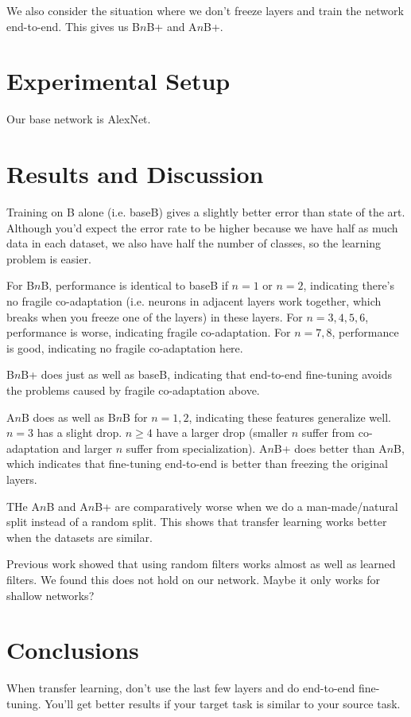 \documentclass[a4paper]{article}
\begin{document}
We also consider the situation where we don't freeze layers and train the
network end-to-end. This gives us B$n$B+ and A$n$B+.

\section{Experimental Setup}
Our base network is AlexNet.

\section{Results and Discussion}
Training on B alone (i.e. baseB) gives a slightly better error than state of the
art. Although you'd expect the error rate to be higher because we have half as
much data in each dataset, we also have half the number of classes, so the
learning problem is easier.

For B$n$B, performance is identical to baseB if $n = 1$ or $n = 2$, indicating
there's no fragile co-adaptation (i.e. neurons in adjacent layers work together,
which breaks when you freeze one of the layers) in these layers. For $n = 3, 4,
5, 6$, performance is worse, indicating fragile co-adaptation. For
$n = 7, 8$, performance is good, indicating no fragile co-adaptation here.

B$n$B+ does just as well as baseB, indicating that end-to-end fine-tuning avoids
the problems caused by fragile co-adaptation above.

A$n$B does as well as B$n$B for $n = 1, 2$, indicating these features
generalize well. $n = 3$ has a slight drop. $n \geq 4$ have a larger drop
(smaller $n$ suffer from co-adaptation and larger $n$ suffer from
specialization). A$n$B+ does better than A$n$B, which indicates that fine-tuning
end-to-end is better than freezing the original layers.

THe A$n$B and A$n$B+ are comparatively worse when we do a man-made/natural split
instead of a random split. This shows that transfer learning works better when
the datasets are similar.

Previous work showed that using random filters works almost as well as learned
filters. We found this does not hold on our network. Maybe it only works
for shallow networks?

\section{Conclusions}
When transfer learning, don't use the last few layers and do end-to-end
fine-tuning. You'll get better results if your target task is similar to your
source task.
\end{document}
